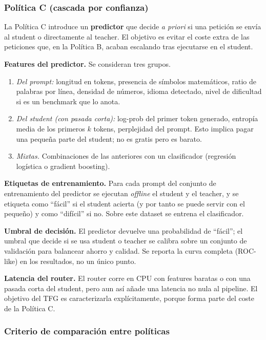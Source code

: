 \documentclass[11pt,a4paper]{article}
\begin{document}
\subsubsection{Política C (cascada por confianza)}

La Política C introduce un \textbf{predictor} que decide \textit{a priori} si una petición se envía al student o directamente al teacher. El objetivo es evitar el coste extra de las peticiones que, en la Política B, acaban escalando tras ejecutarse en el student.

\textbf{Features del predictor.} Se consideran tres grupos.
\begin{enumerate}[nosep,leftmargin=*]
\item \textit{Del prompt:} longitud en tokens, presencia de símbolos matemáticos, ratio de palabras por línea, densidad de números, idioma detectado, nivel de dificultad si es un benchmark que lo anota.
\item \textit{Del student (con pasada corta):} log-prob del primer token generado, entropía media de los primeros $k$ tokens, perplejidad del prompt. Esto implica pagar una pequeña parte del student; no es gratis pero es barato.
\item \textit{Mixtas.} Combinaciones de las anteriores con un clasificador (regresión logística o gradient boosting).
\end{enumerate}

\textbf{Etiquetas de entrenamiento.} Para cada prompt del conjunto de entrenamiento del predictor se ejecutan \textit{offline} el student y el teacher, y se etiqueta como ``fácil'' si el student acierta (y por tanto se puede servir con el pequeño) y como ``difícil'' si no. Sobre este dataset se entrena el clasificador.

\textbf{Umbral de decisión.} El predictor devuelve una probabilidad de ``fácil''; el umbral que decide si se usa student o teacher se calibra sobre un conjunto de validación para balancear ahorro y calidad. Se reporta la curva completa (ROC-like) en los resultados, no un único punto.

\textbf{Latencia del router.} El router corre en CPU con features baratas o con una pasada corta del student, pero aun así añade una latencia no nula al pipeline. El objetivo del TFG es caracterizarla explícitamente, porque forma parte del coste de la Política C.

\subsubsection{Criterio de comparación entre políticas}
\end{document}
